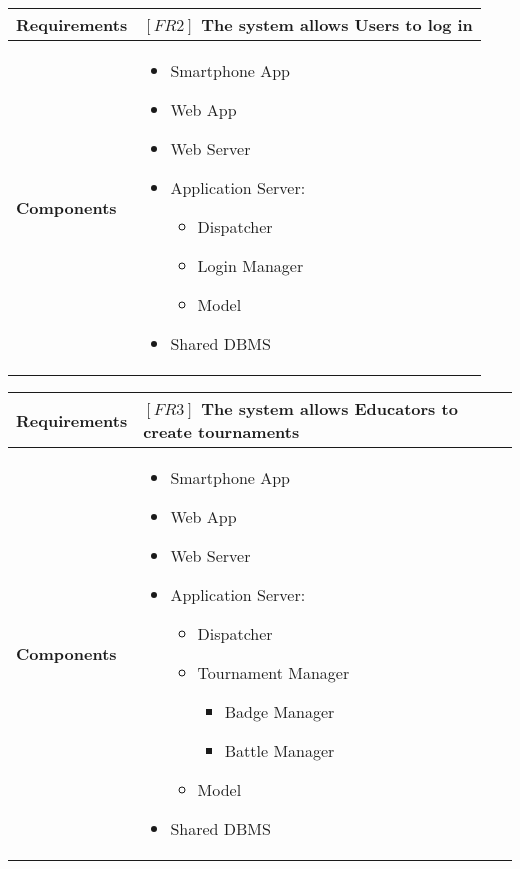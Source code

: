 \documentclass{article}
\begin{document}
\begin{table}[H]
 \renewcommand{\arraystretch}{1.5}
    \centering
    \begin{tabular}{|l|p{10cm}|}
        \hline
        \textbf{Requirements} & $[FR2]$ The system allows Users to log in \\
        \hline
        \textbf{Components} & 
        \begin{itemize}[align=left, topsep=0pt, partopsep=0pt]
            \item Smartphone App
            \item Web App
            \item Web Server
            \item Application Server:
            \begin{itemize}
                \item Dispatcher
                \item Login Manager
                \item Model
            \end{itemize}
            \item Shared DBMS 
        \end{itemize} \\
        \hline
    \end{tabular}
\end{table}

\begin{table}[H]
 \renewcommand{\arraystretch}{1.5}
    \centering
    \begin{tabular}{|l|p{10cm}|}
        \hline
        \textbf{Requirements} & $[FR3]$ The system allows Educators to create tournaments \\
        \hline
        \textbf{Components} & 
        \begin{itemize}[align=left, topsep=0pt, partopsep=0pt]
            \item Smartphone App
            \item Web App
            \item Web Server
            \item Application Server:
            \begin{itemize}
                \item Dispatcher
                \item Tournament Manager
                \begin{itemize}
                    \item Badge Manager
                    \item Battle Manager
                \end{itemize}
                \item Model
            \end{itemize}
            \item Shared DBMS 
        \end{itemize} \\
        \hline
    \end{tabular}
\end{table}
\end{document}
